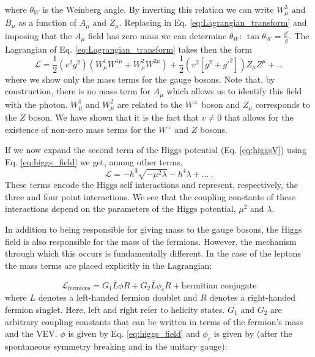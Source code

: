 where $\theta_W$ is the Weinberg angle.
By inverting this relation we can write $W^3_{\mu}$ and $B_{\mu}$ as a function of $A_{\mu}$ and $Z_{\mu}$. Replacing in Eq. \ref{eq:Lagrangian_transform} and imposing that the $A_{\mu}$ field has zero mass we can determine $\theta_W$: $\tan\theta_W=\frac{g'}{g}$. The Lagrangian of Eq. \ref{eq:Lagrangian_transform} takes then the form
\begin{equation}
	\mathcal{L}=\frac{1}{2}\left(v^2g^2\right)\left(W^1_{\mu}W^{1\mu}+W^2_{\mu}W^{2\mu}\right)+\frac{1}{2}\left(v^2\left[g^2+g'^2\right]\right)Z_{\mu}Z^{\mu}+...
\end{equation}
where we show only the mass terms for the gauge bosons. Note that, by construction, there is no mass term for $A_{\mu}$ which allows us to identify this field with the photon. $W^1_{\mu}$ and $W^2_{\mu}$ are related to the $W^{\pm}$ boson and $Z_{\mu}$ corresponds to the $Z$ boson. We have shown that it is the fact that $v\neq0$ that allows for the existence of non-zero mass terms for the $W^{\pm}$ and $Z$ bosons.

If we now expand the second term of the Higgs potential (Eq. \ref{eq:higgsV}) using Eq. \ref{eq:higgs_field} we get, among other terms,
\begin{equation}
\mathcal{L}=-h^3\sqrt{-\mu^2 \lambda} - h^4\lambda+...~.
\label{eq:higgs_couplings}
\end{equation}
These terms encode the Higgs self interactions and represent, respectively, the three and four point interactions. We see that the coupling constants of these interactions depend on the parameters of the Higgs potential, $\mu^2$ and $\lambda$.

In addition to being responsible for giving mass to the gauge bosons, the Higgs field is also responsible for the mass of the fermions. However, the mechanism through which this occurs is fundamentally different. In the case of the leptons the mass terms are placed explicitly in the Lagrangian:

\begin{equation}
	\mathcal{L}_{\text{fermions}}=G_1 \overline{L}\phi R + G_2 \overline{L}\phi_c R + \text{hermitian conjugate}
	\label{eq:fermions_mass}
\end{equation}
where $L$ denotes a left-handed fermion doublet and $R$ denotes a right-handed fermion singlet. Here, left and right refer to helicity states. $G_1$ and $G_2$ are arbitrary coupling constants that can be written in terms of the fermion's mass and the VEV. $\phi$ is given by Eq. \ref{eq:higgs_field} and $\phi_c$ is given by (after the spontaneous symmetry breaking and in the unitary gauge):

